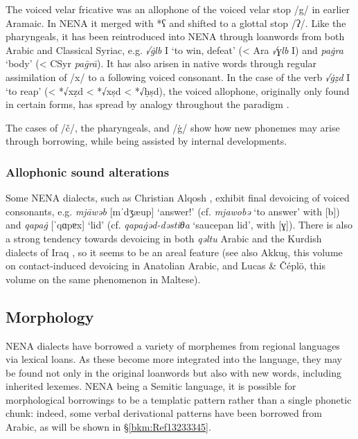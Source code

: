 \documentclass[output=paper]{langsci/langscibook}
\begin{document}
The voiced velar fricative was an allophone of the voiced velar stop /g/ in earlier Aramaic. In NENA it merged with *ʕ and shifted to a glottal stop /ʔ/. Like the pharyngeals, it has been reintroduced into NENA through loanwords from both Arabic and Classical Syriac, e.g. \textit{√\.glb} I ‘to win, defeat’ (< Ara \textit{√ɣlb} I) and \textit{pa\.gra} ‘body’ (< CSyr \textit{pa\={g}rā}). It has also arisen in native words through regular assimilation of /x/ to a following voiced consonant. In the case of the verb \textit{√\.gẓd} I ‘to reap’ (< *√xẓd < *√xṣd  < *√ḥṣd), the voiced allophone, originally only found in certain forms, has spread by analogy throughout the paradigm \citep[20]{Coghill2004}.

The cases of /č/, the pharyngeals, and /\.g/ show how new phonemes may arise through borrowing, while being assisted by internal developments.

\subsubsection{Allophonic sound alterations}

Some NENA dialects, such as Christian Alqosh \citep[27]{Coghill2004}, exhibit final devoicing of voiced consonants, e.g. \textit{mjāwəb} [mˈdʒæup] ‘answer!’ (cf. \textit{mjawobə} ‘to answer’ with [b]) and \textit{qapa\.g} [ˈqɑpɐx] ‘lid’ (cf. \textit{qapa\.gəd-dəstiθa} ‘saucepan lid’, with [ɣ]). There is also a strong tendency towards devoicing in both \textit{qəltu} Arabic \citep[98]{Jastrow1978} and the Kurdish dialects of Iraq \citep[49]{MacKenzie1961}, so it seems to be an areal feature (see also Akkuş, this volume on contact-induced devoicing in Anatolian Arabic, and Lucas \& Čéplö, this volume on the same phenomenon in Maltese).

\subsection{Morphology}

NENA dialects have borrowed a variety of morphemes from regional languages via lexical loans. As these become more integrated into the language, they may be found not only in the original loanwords but also with new words, including inherited lexemes. NENA being a Semitic language, it is possible for morphological borrowings to be a templatic pattern rather than a single phonetic chunk: indeed, some verbal derivational patterns have been borrowed from Arabic, as will be shown in §\ref{bkm:Ref13233345}.
\end{document}
